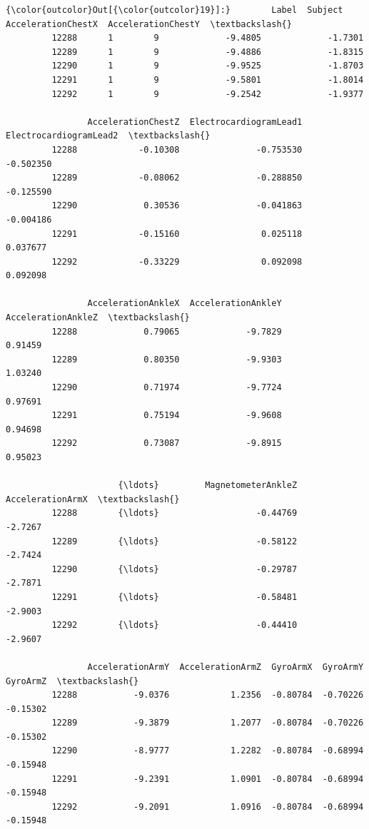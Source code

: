 \documentclass[11pt]{article}
\begin{document}
\begin{Verbatim}[commandchars=\\\{\}]
{\color{outcolor}Out[{\color{outcolor}19}]:}        Label  Subject  AccelerationChestX  AccelerationChestY  \textbackslash{}
         12288      1        9             -9.4805             -1.7301   
         12289      1        9             -9.4886             -1.8315   
         12290      1        9             -9.9525             -1.8703   
         12291      1        9             -9.5801             -1.8014   
         12292      1        9             -9.2542             -1.9377   
         
                AccelerationChestZ  ElectrocardiogramLead1  ElectrocardiogramLead2  \textbackslash{}
         12288            -0.10308               -0.753530               -0.502350   
         12289            -0.08062               -0.288850               -0.125590   
         12290             0.30536               -0.041863               -0.004186   
         12291            -0.15160                0.025118                0.037677   
         12292            -0.33229                0.092098                0.092098   
         
                AccelerationAnkleX  AccelerationAnkleY  AccelerationAnkleZ  \textbackslash{}
         12288             0.79065             -9.7829             0.91459   
         12289             0.80350             -9.9303             1.03240   
         12290             0.71974             -9.7724             0.97691   
         12291             0.75194             -9.9608             0.94698   
         12292             0.73087             -9.8915             0.95023   
         
                      {\ldots}         MagnetometerAnkleZ  AccelerationArmX  \textbackslash{}
         12288        {\ldots}                   -0.44769           -2.7267   
         12289        {\ldots}                   -0.58122           -2.7424   
         12290        {\ldots}                   -0.29787           -2.7871   
         12291        {\ldots}                   -0.58481           -2.9003   
         12292        {\ldots}                   -0.44410           -2.9607   
         
                AccelerationArmY  AccelerationArmZ  GyroArmX  GyroArmY  GyroArmZ  \textbackslash{}
         12288           -9.0376            1.2356  -0.80784  -0.70226  -0.15302   
         12289           -9.3879            1.2077  -0.80784  -0.70226  -0.15302   
         12290           -8.9777            1.2282  -0.80784  -0.68994  -0.15948   
         12291           -9.2391            1.0901  -0.80784  -0.68994  -0.15948   
         12292           -9.2091            1.0916  -0.80784  -0.68994  -0.15948   
         

\end{Verbatim}
\end{document}
